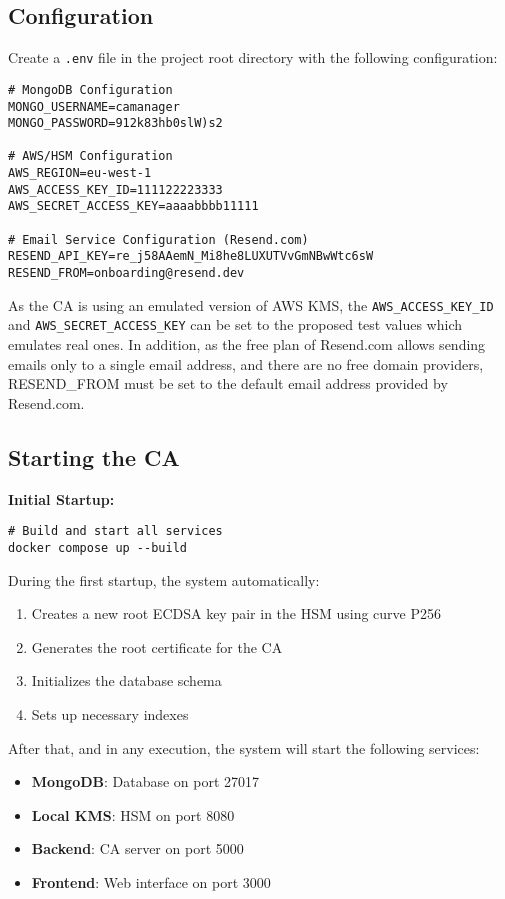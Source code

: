 \subsection{Configuration}

Create a \texttt{.env} file in the project root directory with the following configuration:
\begin{verbatim}
# MongoDB Configuration
MONGO_USERNAME=camanager
MONGO_PASSWORD=912k83hb0slW)s2

# AWS/HSM Configuration
AWS_REGION=eu-west-1
AWS_ACCESS_KEY_ID=111122223333
AWS_SECRET_ACCESS_KEY=aaaabbbb11111

# Email Service Configuration (Resend.com)
RESEND_API_KEY=re_j58AAemN_Mi8he8LUXUTVvGmNBwWtc6sW
RESEND_FROM=onboarding@resend.dev
\end{verbatim}
As the CA is using an emulated version of AWS KMS, the 
\texttt{AWS\_ACCESS\_KEY\_ID} and \texttt{AWS\_SECRET\_ACCESS\_KEY} can be set to the proposed 
test values which emulates real ones. In addition, as the free plan of Resend.com allows sending 
emails only to a single email address, and there are no free domain providers, RESEND\_FROM must be 
set to the default email address provided by Resend.com.

\subsection{Starting the CA}

\textbf{Initial Startup:}
\begin{verbatim}
# Build and start all services
docker compose up --build
\end{verbatim}
During the first startup, the system automatically:
\begin{enumerate}
    \item Creates a new root ECDSA key pair in the HSM using curve P256
    \item Generates the root certificate for the CA
    \item Initializes the database schema
    \item Sets up necessary indexes
\end{enumerate}
After that, and in any execution, the system will start the following services:
\begin{itemize}
    \item \textbf{MongoDB}: Database on port 27017
    \item \textbf{Local KMS}: HSM on port 8080
    \item \textbf{Backend}: CA server on port 5000
    \item \textbf{Frontend}: Web interface on port 3000
\end{itemize}

